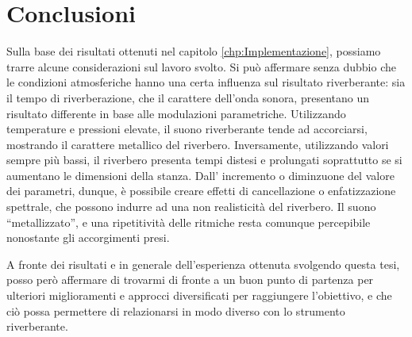 
\chapter{Conclusioni}
\label{chp:Conclusioni}
Sulla base dei risultati ottenuti nel capitolo \ref{chp:Implementazione}, possiamo trarre alcune
considerazioni sul lavoro svolto.
Si può affermare senza dubbio che le condizioni atmosferiche hanno una certa
influenza sul risultato riverberante: sia il tempo di riverberazione,
che il carattere dell'onda sonora, presentano un
risultato differente in base alle modulazioni parametriche.
Utilizzando temperature e pressioni elevate, il suono riverberante tende ad accorciarsi, 
mostrando il carattere metallico del riverbero.
Inversamente, utilizzando valori sempre più bassi, il riverbero presenta tempi distesi e prolungati 
soprattutto se si aumentano le dimensioni della stanza.
Dall' incremento o diminzuone del valore dei parametri, dunque, è possibile creare effetti 
di cancellazione o enfatizzazione spettrale, che possono indurre ad una non realisticità 
del riverbero. Il suono ``metallizzato'', e una ripetitività delle ritmiche resta comunque
percepibile nonostante gli accorgimenti presi.

\bigskip

A fronte dei risultati e in generale dell'esperienza ottenuta 
svolgendo questa tesi, posso però affermare di trovarmi di fronte a un buon punto di partenza per ulteriori
miglioramenti e approcci diversificati per raggiungere l'obiettivo, e che ciò possa
permettere di relazionarsi in modo diverso con lo strumento riverberante.



